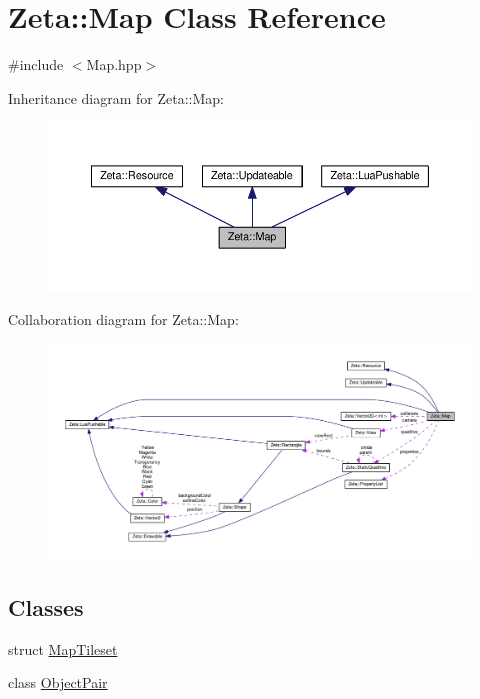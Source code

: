 \hypertarget{classZeta_1_1Map}{\section{Zeta\+:\+:Map Class Reference}
\label{classZeta_1_1Map}
}


{\ttfamily \#include $<$Map.\+hpp$>$}



Inheritance diagram for Zeta\+:\+:Map\+:\nopagebreak
\begin{figure}[H]
\begin{center}
\leavevmode
\includegraphics[width=350pt]{classZeta_1_1Map__inherit__graph}
\end{center}
\end{figure}


Collaboration diagram for Zeta\+:\+:Map\+:\nopagebreak
\begin{figure}[H]
\begin{center}
\leavevmode
\includegraphics[width=350pt]{classZeta_1_1Map__coll__graph}
\end{center}
\end{figure}
\subsection*{Classes}
\begin{DoxyCompactItemize}
\item 
struct \hyperlink{structZeta_1_1Map_1_1MapTileset}{Map\+Tileset}
\item 
class \hyperlink{classZeta_1_1Map_1_1ObjectPair}{Object\+Pair}
\end{DoxyCompactItemize}
